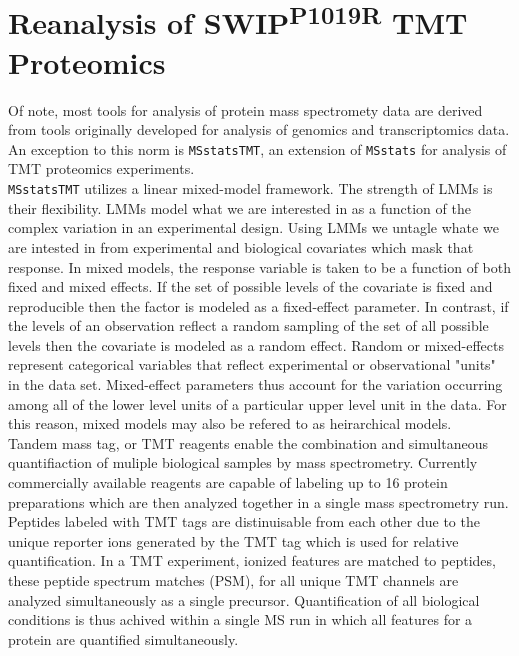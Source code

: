 \documentclass[11pt]{elife}\usepackage[]{graphicx}\usepackage[]{color}
\begin{document}
\section{Reanalysis of SWIP\textsuperscript{P1019R} TMT Proteomics}

Of note, most tools for analysis of protein mass spectromety data are derived
from tools originally developed for analysis of genomics and transcriptomics
data. An exception to this norm is \texttt{MSstatsTMT}, an extension of 
\texttt{MSstats} for analysis of TMT proteomics experiments.\\

\texttt{MSstatsTMT} utilizes a linear mixed-model framework. The strength of
LMMs is their flexibility. LMMs model what we are interested in as a function of
the complex variation in an experimental design. Using LMMs we untagle whate we
are intested in from experimental and biological covariates which mask that
response.  In mixed models, the response variable is taken to be a function of
both fixed and mixed effects.  If the set of possible levels of the covariate is
fixed and reproducible then the factor is modeled as a fixed-effect parameter.
In contrast, if the levels of an observation reflect a random sampling of the
set of all possible levels then the covariate is modeled as a random effect.
Random or mixed-effects represent categorical variables
that reflect experimental or observational "units" in the data set. 
Mixed-effect parameters thus account for the variation occurring among all of the 
lower level units of a particular upper level unit in the data. For this reason,
mixed models may also be refered to as heirarchical models.\\

Tandem mass tag, or TMT reagents enable the combination and simultaneous
quantifiaction of muliple biological samples by mass spectrometry. Currently
commercially available reagents are capable of labeling up to 16 protein
preparations which are then analyzed together in a single mass spectrometry run.
Peptides labeled with TMT tags are distinuisable from each other due to the
unique reporter ions generated by the TMT tag which  is used for relative
quantification.  In a TMT experiment, ionized features are matched to peptides,
these peptide spectrum matches (PSM), for all unique TMT channels are analyzed
simultaneously as a single precursor. Quantification of all biological
conditions is thus achived within a single MS run in which all features for a
protein are quantified simultaneously.\\
\end{document}
